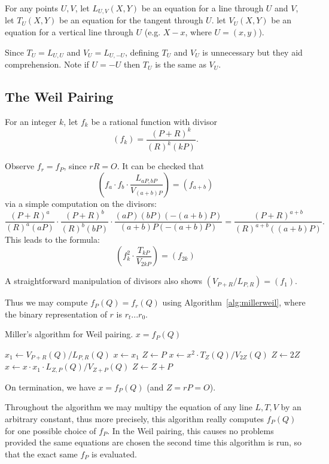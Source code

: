 For any points $U, V$,
let $L_{U,V}(X,Y)$ be an equation for a line through $U$ and $V$,
let $T_{U}(X,Y)$ be an equation for the tangent through $U$.
let
$V_{U}(X,Y)$ be an equation for a vertical line through $U$ (e.g.
$X - x$, where $U = (x, y)$).

Since $T_U = L_{U,U}$ and $V_U = L_{U,-U}$,
defining $T_U$ and $V_U$ is unnecessary
but they aid comprehension.
Note if $U = -U$ then $T_U$ is the same as $V_U$.

\subsection {The Weil Pairing}

For an integer $k$, let $f_k$ be a rational function with divisor
\[
(f_k) = \frac{(P+R)^k}{(R)^k(kP)} .
\]

Observe $f_r = f_P$, since $rR = O$.
It can be checked that
\[
\left(
f_a \cdot f_b \cdot \frac{L_{aP,bP}}{V_{(a+b)P}}
\right) = (f_{a+b})
\]
via a simple computation on the divisors:
\[
\frac{(P+R)^a}{(R)^a(aP)}
\cdot
\frac{(P+R)^b}{(R)^b(bP)}
\cdot
\frac{(aP)(bP)(-(a+b)P)}{(a+b)P(-(a+b)P)}
=
\frac{(P+R)^{a+b}}{(R)^{a+b}((a+b)P)} .
\]
This leads to the formula:
\[
\left(
f_k^2 \cdot \frac{T_{kP}}{V_{2kP}}
\right) = (f_{2k})
\]

A straightforward manipulation of divisors also shows
$( V_{P+R} / L_{P,R}) = (f_1)$.

Thus we may compute $f_P(Q) = f_r(Q)$ using Algorithm~\ref{alg:millerweil},
where the binary representation of $r$ is $r_t ... r_0$.

\begin{algorithm}
\caption{\label{alg:millerweil}Miller's algorithm for Weil pairing. $x = f_P(Q)$}
\begin{algorithmic}[1]
\STATE $x_1 \gets V_{P+R}(Q) / L_{P,R}(Q)$
\STATE $x \gets x_1$
\STATE $Z \gets P$
    \STATE $x \gets x^2 \cdot T_Z(Q) / V_{2Z}(Q)$
    \STATE $Z \gets 2Z$
	\STATE $x \gets x \cdot x_1 \cdot L_{Z, P}(Q) / V_{Z+P}(Q)$
	\STATE $Z \gets Z + P$
    \ENDIF
\ENDFOR
\end{algorithmic}
\end{algorithm}

On termination, we have $x = f_P(Q)$ (and $Z = rP = O$).

Throughout the algorithm we may multipy the equation of any line $L, T, V$
by an arbitrary constant, thus more precisely, this algorithm
really computes $f_P(Q)$ for one possible choice of $f_P$.
In the Weil pairing,
this causes no problems provided the same equations are chosen the second
time this algorithm is run, so that the exact same $f_P$ is evaluated.

